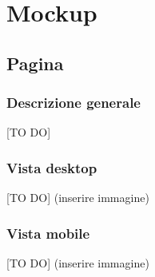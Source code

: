 %
%

\appendix


\section{Mockup} %
\label{sec:mockup}
	\subsection{Pagina} %
	\label{sub:pagina}
		\subsubsection{Descrizione generale} %
		\label{ssub:descrizione_generale}
		[TO DO]

		\subsubsection{Vista desktop} %
		\label{ssub:vista_desktop}
		[TO DO] (inserire immagine)

		\subsubsection{Vista mobile} %
		\label{ssub:vista_mobile}
		[TO DO] (inserire immagine)
